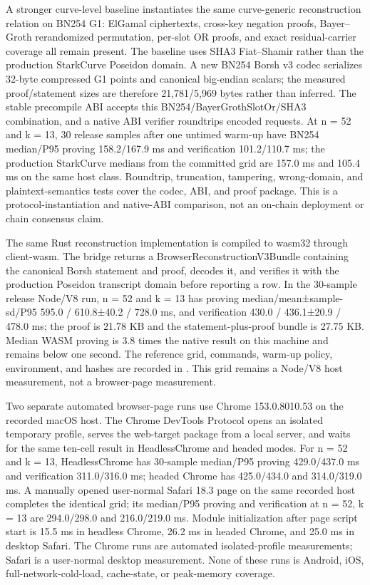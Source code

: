 \documentclass[11pt]{article}
\begin{document}
A stronger curve-level baseline instantiates the same curve-generic reconstruction relation on BN254 G1: ElGamal ciphertexts, cross-key negation proofs, Bayer–Groth rerandomized permutation, per-slot OR proofs, and exact residual-carrier coverage all remain present. The baseline uses SHA3 Fiat–Shamir rather than the production StarkCurve Poseidon domain. A new BN254 Borsh v3 codec serializes 32-byte compressed G1 points and canonical big-endian scalars; the measured proof/statement sizes are therefore 21,781/5,969 bytes rather than inferred. The stable precompile ABI accepts this BN254/BayerGrothSlotOr/SHA3 combination, and a native ABI verifier roundtrips encoded requests. At n = 52 and k = 13, 30 release samples after one untimed warm-up have BN254 median/P95 proving 158.2/167.9 ms and verification 101.2/110.7 ms; the production StarkCurve medians from the committed grid are 157.0 ms and 105.4 ms on the same host class. Roundtrip, truncation, tampering, wrong-domain, and plaintext-semantics tests cover the codec, ABI, and proof package. This is a protocol-instantiation and native-ABI comparison, not an on-chain deployment or chain consensus claim.

The same Rust reconstruction implementation is compiled to wasm32 through client-wasm. The bridge returns a BrowserReconstructionV3Bundle containing the canonical Borsh statement and proof, decodes it, and verifies it with the production Poseidon transcript domain before reporting a row. In the 30-sample release Node/V8 run, n = 52 and k = 13 has proving median/mean±sample-sd/P95 595.0 / 610.8±40.2 / 728.0 ms, and verification 430.0 / 436.1±20.9 / 478.0 ms; the proof is 21.78 KB and the statement-plus-proof bundle is 27.75 KB. Median WASM proving is 3.8 times the native result on this machine and remains below one second. The reference grid, commands, warm-up policy, environment, and hashes are recorded in . This grid remains a Node/V8 host measurement, not a browser-page measurement.

Two separate automated browser-page runs use Chrome 153.0.8010.53 on the recorded macOS host. The Chrome DevTools Protocol opens an isolated temporary profile, serves the web-target package from a local server, and waits for the same ten-cell result in HeadlessChrome and headed modes. For n = 52 and k = 13, HeadlessChrome has 30-sample median/P95 proving 429.0/437.0 ms and verification 311.0/316.0 ms; headed Chrome has 425.0/434.0 and 314.0/319.0 ms. A manually opened user-normal Safari 18.3 page on the same recorded host completes the identical grid; its median/P95 proving and verification at n = 52, k = 13 are 294.0/298.0 and 216.0/219.0 ms. Module initialization after page script start is 15.5 ms in headless Chrome, 26.2 ms in headed Chrome, and 25.0 ms in desktop Safari. The Chrome runs are automated isolated-profile measurements; Safari is a user-normal desktop measurement. None of these runs is Android, iOS, full-network-cold-load, cache-state, or peak-memory coverage.
\end{document}
